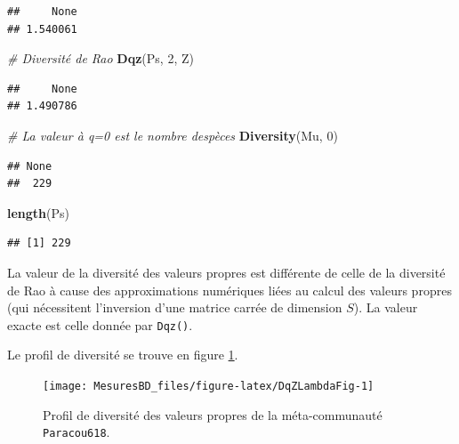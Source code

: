 \documentclass[
  11pt,
  french,
  a4paper,
  extrafontsizes,onecolumn,openright
  ]{memoir}
\newenvironment{Shaded}{\begin{snugshade}}{\end{snugshade}}
\newcommand{\CommentTok}[1]{\textcolor[rgb]{0.56,0.35,0.01}{\textit{#1}}}
\newcommand{\DecValTok}[1]{\textcolor[rgb]{0.00,0.00,0.81}{#1}}
\newcommand{\FunctionTok}[1]{\textcolor[rgb]{0.13,0.29,0.53}{\textbf{#1}}}
\newcommand{\NormalTok}[1]{#1}
\begin{document}
\begin{verbatim}
##     None 
## 1.540061
\end{verbatim}

\begin{Shaded}
\begin{Highlighting}[]
\CommentTok{\# Diversité de Rao}
\FunctionTok{Dqz}\NormalTok{(Ps, }\DecValTok{2}\NormalTok{, Z)}
\end{Highlighting}
\end{Shaded}

\begin{verbatim}
##     None 
## 1.490786
\end{verbatim}

\begin{Shaded}
\begin{Highlighting}[]
\CommentTok{\# La valeur à q=0 est le nombre d\textquotesingle{}espèces}
\FunctionTok{Diversity}\NormalTok{(Mu, }\DecValTok{0}\NormalTok{)}
\end{Highlighting}
\end{Shaded}

\begin{verbatim}
## None 
##  229
\end{verbatim}

\begin{Shaded}
\begin{Highlighting}[]
\FunctionTok{length}\NormalTok{(Ps)}
\end{Highlighting}
\end{Shaded}

\begin{verbatim}
## [1] 229
\end{verbatim}

\normalsize

La valeur de la diversité des valeurs propres est différente de celle de la diversité de Rao à cause des approximations numériques liées au calcul des valeurs propres (qui nécessitent l'inversion d'une matrice carrée de dimension \(S\)).
La valeur exacte est celle donnée par \texttt{Dqz()}.

Le profil de diversité se trouve en figure \ref{fig:DqZLambdaFig}.



\scriptsize

\begin{figure}

{\centering \texttt{[image: MesuresBD\_files/figure-latex/DqZLambdaFig-1]} 

}

\caption{Profil de diversité des valeurs propres de la méta-communauté \texttt{Paracou618}.}\label{fig:DqZLambdaFig}
\end{figure}
\end{document}

